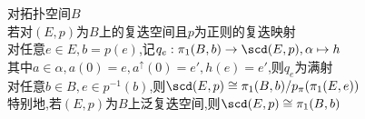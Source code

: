 \begin{dingli}
对拓扑空间$B$\\
若对$(E,p)$为$B$上的复迭空间且$p$为正则的复迭映射\\
对任意$e\in E,b=p(e)$,记$q_{e}:\pi_1(B,b)\to\scd(E,p),\alpha\mapsto h$\\
其中$a\in\alpha,a(0)=e,a^{\uparrow}(0)=e',h(e)=e'$,则$q_{e}$为满射\\
对任意$b\in B,e\in p^{-1}(b)$,则$\scd(E,p)\cong \pi_1(B,b)/p_{\pi}(\pi_1(E,e))$\\
特别地,若$(E,p)$为$B$上泛复迭空间,则$\scd(E,p)\cong \pi_1(B,b)$
\end{dingli}


%